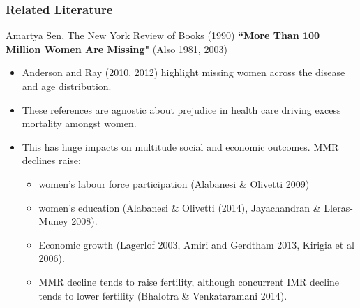 \documentclass[10pt,letterpaper,subeqn]{beamer}
\begin{document}
\begin{frame}
\frametitle{Related Literature}
Amartya Sen, The New York Review of Books (1990) \textbf{``More Than 100 Million Women Are Missing"} (Also 1981, 2003) \vspace{4mm}
\begin{itemize}
\item Anderson and Ray (2010, 2012) highlight missing women across the disease and age distribution.
\item These references are agnostic about prejudice in health care driving excess mortality amongst women.
\item This has huge impacts on multitude social and economic outcomes.  MMR declines raise:
  \begin{itemize}
  \item women's labour force participation (Alabanesi \& Olivetti 2009) 
  \item women's education (Alabanesi \& Olivetti (2014), Jayachandran \& Lleras-Muney 2008).
  \item Economic growth (Lagerlof 2003, Amiri and Gerdtham 2013, Kirigia et al 2006).
  \item MMR decline tends to raise fertility, although concurrent IMR decline tends to lower fertility (Bhalotra \& Venkataramani 2014).
  \end{itemize}
\end{itemize}

\end{frame}
\end{document}
